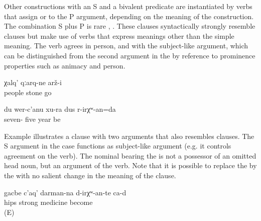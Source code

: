 Other constructions with an  S and a bivalent predicate are instantiated by verbs that assign  or  to the P argument, depending on the meaning of the construction. The combination  S plus  P is rare , . These clauses syntactically strongly resemble  clauses but make use of verbs that express meanings other than the simple  meaning. The verb agrees in person,  and  with the subject-like argument, which can be distinguished from the second argument in the  by reference to prominence properties such as animacy and person.

\begin{exe}
	\ex	\label{ex:The people turned into stones}
	\gll	χalq'	qːarq-ne	arž-i\\
		people	stone	go\\
	\glt	{}

	\ex	\label{ex:I will be 75 years old}
	\gll	du	wer-c'anu	xu-ra	dus	r-irχʷ-an=da\\
			seven-	five year	be\\
	\glt	{}
\end{exe}

Example  illustrates a clause with two arguments that also resembles \linebreak clauses. The S argument in the  case functions as subject-like argument (e.g. it controls agreement on the verb). The nominal bearing the  is not a possessor of an omitted head noun, but an argument of the verb. Note that it is possible to replace the  by the  with no salient change in the meaning of the clause.

\begin{exe}
	\ex	\label{ex:The hips will be a strong medicine}
	\gll	gacbe	c'aq'	darman-na	d-irχʷ-an-te	ca-d\\
		hips	strong	medicine	become	\\
	\glt	{} (E)
\end{exe}



